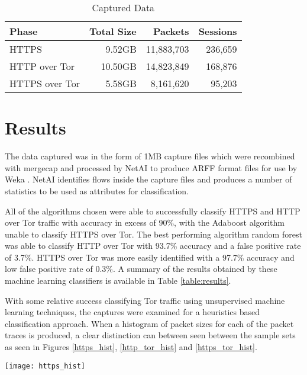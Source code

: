\documentclass[conference]{IEEEtran}
\begin{document}
\begin{table}[H]
  \begin{tabular*}{\linewidth}{lrrr}
    \toprule
    Phase & Total Size & Packets & Sessions\\
    \midrule
    HTTPS & 9.52GB & 11,883,703 & 236,659\\
    HTTP over Tor & 10.50GB & 14,823,849 & 168,876\\
    HTTPS over Tor & 5.58GB & 8,161,620 & 95,203\\
    \bottomrule
  \end{tabular*}
  \caption{Captured Data} \label{table:datasets}
\end{table}

\section{Results}

The data captured was in the form of 1MB capture files which were recombined
with mergecap \parencite{Renfro:fk} and processed by NetAI
\parencite{swinbut:2006fk} to produce ARFF format files for use by Weka
\parencite{Hall:2009p7662,Bouckaert:2010we}. NetAI identifies flows inside the
capture files and produces a number of statistics to be used as attributes for
classification.

All of the algorithms chosen were able to successfully classify HTTPS and HTTP
over Tor traffic with accuracy in excess of 90\%, with the Adaboost algorithm
unable to classify HTTPS over Tor. The best performing algorithm random forest
was able to classify HTTP over Tor with 93.7\% accuracy and a false positive
rate of 3.7\%. HTTPS over Tor was more easily identified with a 97.7\% accuracy
and low false positive rate of 0.3\%. A summary of the results obtained by
these machine learning classifiers is available in Table \ref{table:results}.



With some relative success classifying Tor traffic using unsupervised machine
learning techniques, the captures were examined for a heuristics based
classification approach. When a histogram of packet sizes for each of the
packet traces is produced, a clear distinction can between seen between the
sample sets as seen in Figures \ref{https_hist}, \ref{http_tor_hist} and
\ref{https_tor_hist}.

\begin{figure*}
  \centering\texttt{[image: https\_hist]}
  \caption{Histogram of packet size for HTTPS traffic}
  \label{https_hist}
\end{figure*}
\end{document}
